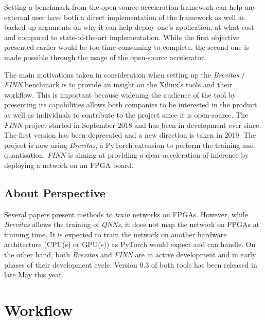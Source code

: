 Setting a benchmark from the open-source acceleration framework can help any external user have both a direct implementation of the framework as well as backed-up arguments on why it can help deploy one's application, at what cost and compared to state-of-the-art implementation. While the first objective presented earlier would be too time-consuming to complete, the second one is made possible through the usage of the open-source accelerator.

The main motivations taken in consideration when setting up the \emph{Brevitas} / \emph{FINN} benchmark is to provide an insight on the Xilinx's tools and their workflow. This is important because widening the audience of the tool by presenting its capabilities allows both companies to be interested in the product as well as individuals to contribute to the project since it is open-source. The \emph{FINN} project started in September 2018 and has been in development ever since. The first version has been deprecated and a new direction is taken in 2019. The project is now using \emph{Brevitas}, a PyTorch extension to perform the training and quantisation. \emph{FINN} is aiming at providing a clear acceleration of inference by deploying a network on an FPGA board.


\subsection{About Perspective}

Several papers present methods to \emph{train} networks on FPGAs. However, while \emph{Brevitas} allows the training of \emph{QNNs}, it does not map the network on FPGAs at training time. It is expected to train the network on another hardware architecture (CPU(s) or GPU(s)) as PyTorch would expect and can handle. On the other hand, both \emph{Brevitas} and \emph{FINN} are in active development and in early phases of their development cycle. Version 0.3 of both tools has been released in late May this year.


\section{Workflow}

